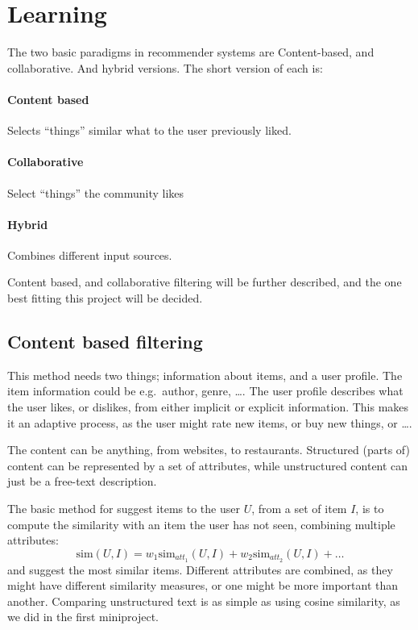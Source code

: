 \section{Learning}
The two basic paradigms in recommender systems are Content-based, and collaborative. And hybrid versions. The short version of each is:
\paragraph{Content based} Selects ``things'' similar what to the user previously liked.
\paragraph{Collaborative} Select ``things'' the community likes
\paragraph{Hybrid} Combines different input sources.

Content based, and collaborative filtering will be further described, and the one best fitting this project will be decided.

\subsection{Content based filtering}
This method needs two things; information about items, and a user profile.
The item information could be e.g.\ author, genre, \ldots.
The user profile describes what the user likes, or dislikes, from either implicit or explicit information.
This makes it an adaptive process, as the user might rate new items, or buy new things, or \ldots.

The content can be anything, from websites, to restaurants. Structured (parts of) content can be represented by a set of attributes, while unstructured content can just be a free-text description.

The basic method for suggest items to the user $U$, from a set of item $I$, is to compute the similarity with an item the user has not seen, combining multiple attributes:
\[
    \mathrm{sim}(U, I) = w_1 \mathrm{sim}_{att_1}(U, I) + w_2 \mathrm{sim}_{att_2}(U, I) + \ldots
\]
and suggest the most similar items.
Different attributes are combined, as they might have different similarity measures, or one might be more important than another.
Comparing unstructured text is as simple as using cosine similarity, as we did in the first miniproject.

